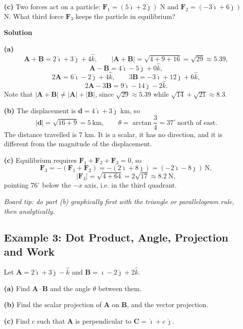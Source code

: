 \documentclass[../main.tex]{subfiles}
\begin{document}
\textbf{(c)} Two forces act on a particle: $\mathbf{F}_1 = (5\hat{\imath}+2\hat{\jmath})$ N and $\mathbf{F}_2 = (-3\hat{\imath}+6\hat{\jmath})$ N. What third force $\mathbf{F}_3$ keeps the particle in equilibrium?

\bigskip
\textbf{Solution}

\textbf{(a)}
\[
\mathbf{A}+\mathbf{B} = 2\hat{\imath} + 3\hat{\jmath} + 4\hat{k},
\qquad
|\mathbf{A}+\mathbf{B}| = \sqrt{4+9+16} = \sqrt{29} \approx 5.39,
\]
\[
\mathbf{A}-\mathbf{B} = 4\hat{\imath} - 5\hat{\jmath} + 0\hat{k},
\]
\[
2\mathbf{A} = 6\hat{\imath}-2\hat{\jmath}+4\hat{k},
\qquad
3\mathbf{B} = -3\hat{\imath}+12\hat{\jmath}+6\hat{k},
\]
\[
2\mathbf{A}-3\mathbf{B} = 9\hat{\imath} - 14\hat{\jmath} - 2\hat{k}.
\]
Note that $|\mathbf{A}+\mathbf{B}| \neq |\mathbf{A}|+|\mathbf{B}|$, since $\sqrt{29}\approx 5.39$ while $\sqrt{14}+\sqrt{21}\approx 8.3$.

\textbf{(b)} The displacement is $\mathbf{d} = 4\hat{\imath}+3\hat{\jmath}$ km, so
\[
|\mathbf{d}| = \sqrt{16+9} = 5\ \text{km},
\qquad
\theta = \arctan\frac{3}{4} = 37^\circ \ \text{north of east}.
\]
The distance travelled is $7$ km. It is a scalar, it has no direction, and it is different from the magnitude of the displacement.

\textbf{(c)} Equilibrium requires $\mathbf{F}_1+\mathbf{F}_2+\mathbf{F}_3 = 0$, so
\[
\mathbf{F}_3 = -(\mathbf{F}_1+\mathbf{F}_2) = -(2\hat{\imath}+8\hat{\jmath}) = (-2\hat{\imath}-8\hat{\jmath})\ \text{N},
\]
\[
|\mathbf{F}_3| = \sqrt{4+64} = 2\sqrt{17} \approx 8.2\ \text{N},
\]
pointing $76^\circ$ below the $-x$ axis, i.e. in the third quadrant.

\bigskip
\noindent \emph{Board tip: do part (b) graphically first with the triangle or parallelogram rule, then analytically.}


\subsection{Example 3: Dot Product, Angle, Projection and Work}

Let $\mathbf{A} = 2\hat{\imath}+3\hat{\jmath}-\hat{k}$ and $\mathbf{B} = \hat{\imath}-2\hat{\jmath}+2\hat{k}$.

\textbf{(a)} Find $\mathbf{A}\cdot\mathbf{B}$ and the angle $\theta$ between them.

\textbf{(b)} Find the scalar projection of $\mathbf{A}$ on $\mathbf{B}$, and the vector projection.

\textbf{(c)} Find $c$ such that $\mathbf{A}$ is perpendicular to $\mathbf{C} = \hat{\imath} + c\,\hat{\jmath}$.
\end{document}
